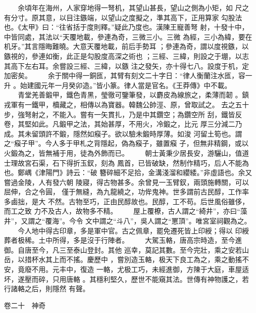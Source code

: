 \documentclass{ctexart}
\begin{document}
　　余頃年在海州，人家穿地得一弩机，其望山甚長，望山之側為小矩，如 尺之有分寸。原其意，以目注鏃端，以望山之度擬之，準其高下，正用算家 勾股法也。《太甲》曰：``往省括于度則釋。''疑此乃度也。漢陳王寵善弩 射，十發十中，中皆同處，其法以``天覆地載，參連為奇，三微三小。三微 為經，三小為緯，要在机牙。''其言隱晦難曉。大意天覆地載，前后手勢耳 ；參連為奇，謂以度視鏃，以鏃視的，參連如衡，此正是勾股度高深之術也 ；三經、三緯，則設之于堋，以志其高下左右耳。余嘗設三經、三緯，以鏃 注之發矢，亦十得七八。設度于机，定加密矣。 　　余于關中得一銅匜，其臂有刻文二十字日：``律人衡蘭注水匜，容一升 。始建國元年一月癸卯造。''皆小篆。律人當是官名。《王莽傳》中不載。 　　青堂羌善鍛甲，鐵色青黑，瑩徹可鑒筆發，以麝皮為線旅之，柔薄而韌 。鎮戎軍有一鐵甲，櫝藏之，相傳以為寶器。韓魏公帥涇、原，曾取試之。 去之五十步，強弩射之，不能入。嘗有一矢貫扎，乃是中其鑽空；為鑽空所 刮，鐵皆反卷，其堅如此。凡鍛甲之法，其始甚厚，不用火，冷鍛之，比元 厚三分減二乃成。其未留頭許不鍛，隱然如瘊子。欲以驗未鍛時厚薄。如浚 河留土筍也。謂之``瘊子甲''。今人多于甲札之背隱起，偽為瘊子，雖置瘊 子，但無非精鋼，或以火鍛為之，皆無補于用，徒為外飾而已。 　　朝士黃秉少居長安，游驪山，值道士理故宮石渠，石下得折玉釵，刻為 鳳首，已皆破缺，然制作精巧，后人不能為也。鄭嵎《津陽門》詩云：``破 簪碎細不足拾，金溝淺溜和纓緌。''非虛語也。余又嘗過金陵，人有發六朝 陵寢，得古物甚多。余曾見一玉臂釵，兩頭施轉關，可以屈伸，合之令圓， 僅于無縫，為九龍繞之，功侔鬼神。世多謂前古民醇，工作率多鹵拙，是大 不然。古物至巧，正由民醇故也。民醇，工不苟。后世風俗雖侈，而工之致 力不及古人，故物多不精。 　　屋上覆橑，古人謂之``綺井''，亦曰``藻井''，又謂之``覆海''。今令 文中謂之``斗八''，吳人謂之``罳頂''。唯宮室祠觀為之。 　　今人地中得古印章，多是軍中官。古之佩章，罷免遷死皆上印綬；得以 印綬葬者极稀。土中所得，多是沒于行陣者。 　　大駕玉輅，唐高宗時造，至今進御。自唐至今，凡三至泰山登封。其他 巡幸，莫記其數。至今完壯，乘之安若山岳，以措杯水其上而不搖。慶歷中 ，嘗別造玉輅，极天下良工為之，乘之動搖不安，竟廢不用。元丰中，復造 一輅，尤极工巧，未經進御，方陳于大庭，車屋适坏，遂壓而碎，只用唐輅 。其穩利堅久，歷世不能窺其法。世傳有神物護之，若行諸輅之后，則隱然 有聲。

卷二十　神奇
\end{document}
